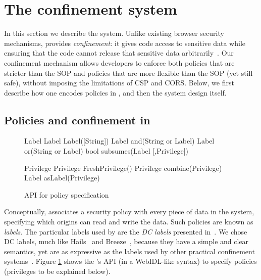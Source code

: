 

\section{The \sys{} confinement system}
\label{sec:system}

In this section we describe the \sys{} system.
%
Unlike existing browser security mechanisms, \sys{} provides
\emph{confinement:} it gives code access to sensitive
data while ensuring that the code cannot release that sensitive
data arbitrarily~\cite{SaltzerS75}.
%
Our confinement mechanism allows developers to enforce both policies
that are stricter than the SOP and policies that are more flexible
than the SOP (yet still safe), without imposing the limitations of CSP
and CORS.
%
Below, we first describe how one encodes policies in \sys{}, and then
the system design itself.

\subsection{Policies and confinement in \sys{}}
\label{sec:system:policy}

\begin{figure}
{\small{
\begin{webidl}
Label {
  Label Label([String])
  Label and(String or Label)
  Label or(String or Label)
  bool subsumes(Label [,Privilege])
}
\end{webidl}
\begin{webidl}
Privilege {
  Privilege FreshPrivilege()
  Privilege combine(Privilege)
  Label asLabel(Privilege)
}
\end{webidl}
}}
\caption{\label{fig:APIspec} API for policy specification}
\end{figure}


Conceptually, \sys{} associates a security policy with every piece of
data in the system, specifying which origins can read and write the
data.
%
Such policies are known as \emph{labels}.
%
The particular labels used by \sys{} are the \emph{DC
labels} presented in~\cite{stefan:2011:dclabels}.
%
We chose DC labels, much like Hails~\cite{giffin:2012:hails} and
Breeze~\cite{Breeze13}, because they have a simple and clear semantics, yet are
as expressive as the labels used by other practical confinement
systems~\cite{GenLabels}. Figure \ref{fig:APIspec} shows the \sys{}'s API (in a
WebIDL-like syntax) to specify policies (privileges to be
explained below).


